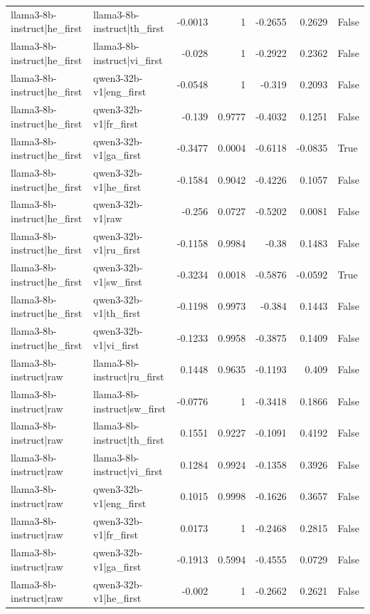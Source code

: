 \begin{table}
\begin{tabular}{l l r r r r l}
llama3-8b-instruct|he_first & llama3-8b-instruct|th_first & -0.0013 & 1 & -0.2655 & 0.2629 & False \\
llama3-8b-instruct|he_first & llama3-8b-instruct|vi_first & -0.028 & 1 & -0.2922 & 0.2362 & False \\
llama3-8b-instruct|he_first & qwen3-32b-v1|eng_first & -0.0548 & 1 & -0.319 & 0.2093 & False \\
llama3-8b-instruct|he_first & qwen3-32b-v1|fr_first & -0.139 & 0.9777 & -0.4032 & 0.1251 & False \\
llama3-8b-instruct|he_first & qwen3-32b-v1|ga_first & -0.3477 & 0.0004 & -0.6118 & -0.0835 & True \\
llama3-8b-instruct|he_first & qwen3-32b-v1|he_first & -0.1584 & 0.9042 & -0.4226 & 0.1057 & False \\
llama3-8b-instruct|he_first & qwen3-32b-v1|raw & -0.256 & 0.0727 & -0.5202 & 0.0081 & False \\
llama3-8b-instruct|he_first & qwen3-32b-v1|ru_first & -0.1158 & 0.9984 & -0.38 & 0.1483 & False \\
llama3-8b-instruct|he_first & qwen3-32b-v1|sw_first & -0.3234 & 0.0018 & -0.5876 & -0.0592 & True \\
llama3-8b-instruct|he_first & qwen3-32b-v1|th_first & -0.1198 & 0.9973 & -0.384 & 0.1443 & False \\
llama3-8b-instruct|he_first & qwen3-32b-v1|vi_first & -0.1233 & 0.9958 & -0.3875 & 0.1409 & False \\
llama3-8b-instruct|raw & llama3-8b-instruct|ru_first & 0.1448 & 0.9635 & -0.1193 & 0.409 & False \\
llama3-8b-instruct|raw & llama3-8b-instruct|sw_first & -0.0776 & 1 & -0.3418 & 0.1866 & False \\
llama3-8b-instruct|raw & llama3-8b-instruct|th_first & 0.1551 & 0.9227 & -0.1091 & 0.4192 & False \\
llama3-8b-instruct|raw & llama3-8b-instruct|vi_first & 0.1284 & 0.9924 & -0.1358 & 0.3926 & False \\
llama3-8b-instruct|raw & qwen3-32b-v1|eng_first & 0.1015 & 0.9998 & -0.1626 & 0.3657 & False \\
llama3-8b-instruct|raw & qwen3-32b-v1|fr_first & 0.0173 & 1 & -0.2468 & 0.2815 & False \\
llama3-8b-instruct|raw & qwen3-32b-v1|ga_first & -0.1913 & 0.5994 & -0.4555 & 0.0729 & False \\
llama3-8b-instruct|raw & qwen3-32b-v1|he_first & -0.002 & 1 & -0.2662 & 0.2621 & False \\

\end{tabular}
\end{table}
